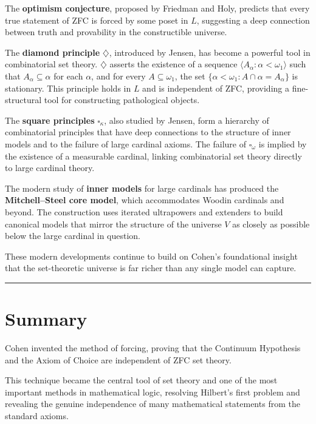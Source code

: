 The \textbf{optimism conjecture}, proposed by Friedman and Holy, predicts that every true statement of ZFC is forced by some poset in $L$, suggesting a deep connection between truth and provability in the constructible universe.

The \textbf{diamond principle} $\diamondsuit$, introduced by Jensen, has become a powerful tool in combinatorial set theory. $\diamondsuit$ asserts the existence of a sequence $\langle A_\alpha : \alpha < \omega_1 \rangle$ such that $A_\alpha \subseteq \alpha$ for each $\alpha$, and for every $A \subseteq \omega_1$, the set $\{\alpha < \omega_1 : A \cap \alpha = A_\alpha\}$ is stationary. This principle holds in $L$ and is independent of ZFC, providing a fine-structural tool for constructing pathological objects.

The \textbf{square principles} $\square_\kappa$, also studied by Jensen, form a hierarchy of combinatorial principles that have deep connections to the structure of inner models and to the failure of large cardinal axioms. The failure of $\square_\omega$ is implied by the existence of a measurable cardinal, linking combinatorial set theory directly to large cardinal theory.

The modern study of \textbf{inner models} for large cardinals has produced the \textbf{Mitchell--Steel core model}, which accommodates Woodin cardinals and beyond. The construction uses iterated ultrapowers and extenders to build canonical models that mirror the structure of the universe $V$ as closely as possible below the large cardinal in question.

These modern developments continue to build on Cohen's foundational insight that the set-theoretic universe is far richer than any single model can capture.

\begin{center}\rule{0.5\linewidth}{0.5pt}\end{center}

\section*{Summary}

Cohen invented the method of forcing, proving that the Continuum Hypothesis and the Axiom of Choice are independent of ZFC set theory.

This technique became the central tool of set theory and one of the most important methods in mathematical logic, resolving Hilbert's first problem and revealing the genuine independence of many mathematical statements from the standard axioms.

